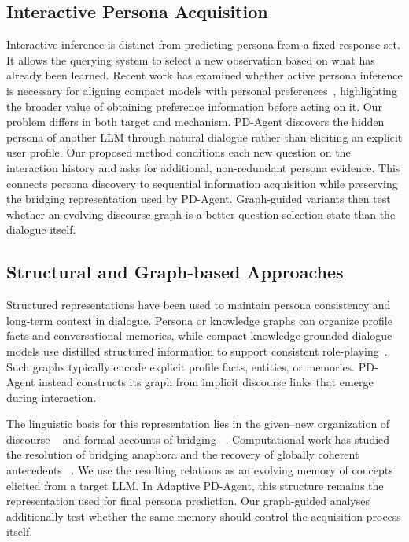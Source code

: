 \documentclass{ieeeaccess}
\begin{document}
\subsection{Interactive Persona Acquisition}

Interactive inference is distinct from predicting persona from a fixed response set. It allows
the querying system to select a new observation based on what has already been learned.
Recent work has examined whether active persona inference is necessary for aligning compact
models with personal preferences~\cite{tang2025activepersona}, highlighting the broader value
of obtaining preference information before acting on it. Our problem differs in both target
and mechanism. PD-Agent discovers the hidden persona of another LLM through natural dialogue
rather than eliciting an explicit user profile. Our proposed method conditions each new
question on the interaction history and asks for additional, non-redundant persona evidence.
This connects persona discovery to sequential information acquisition while preserving the
bridging representation used by PD-Agent. Graph-guided variants then test whether an evolving
discourse graph is a better question-selection state than the dialogue itself.

\subsection{Structural and Graph-based Approaches}

Structured representations have been used to maintain persona consistency and long-term
context in dialogue. Persona or knowledge graphs can organize profile facts and conversational
memories, while compact knowledge-grounded dialogue models use distilled structured
information to support consistent role-playing~\cite{hu2025efficient,wang2024ai}. Such graphs
typically encode explicit profile facts, entities, or memories. PD-Agent instead constructs
its graph from implicit discourse links that emerge during interaction.

The linguistic basis for this representation lies in the given--new organization of discourse
~\cite{clark1977comprehension} and formal accounts of bridging
~\cite{asher1998bridging,irmer2011bridging}. Computational work has studied the resolution of
bridging anaphora and the recovery of globally coherent antecedents
~\cite{gardent2003bridging,hou2013global}. We use the resulting relations as an evolving
memory of concepts elicited from a target LLM. In Adaptive PD-Agent, this structure remains
the representation used for final persona prediction. Our graph-guided analyses additionally
test whether the same memory should control the acquisition process itself.
\end{document}
